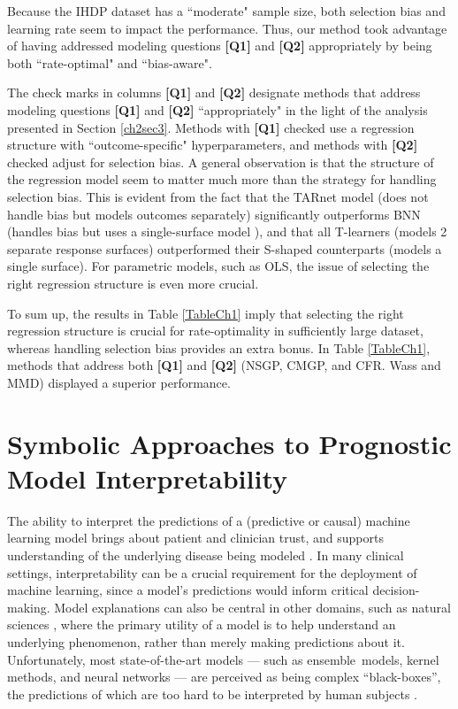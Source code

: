 \documentclass [PhD] {uclathes}
\begin{document}
Because the IHDP dataset has a ``moderate" sample size, both selection bias and learning rate seem to impact the performance. Thus, our method took advantage of having addressed modeling questions \textbf{[Q1]} and \textbf{[Q2]} appropriately by being both ``rate-optimal" and ``bias-aware". 

The check marks in columns \textbf{[Q1]} and \textbf{[Q2]} designate methods that address modeling questions \textbf{[Q1]} and \textbf{[Q2]} ``appropriately" in the light of the analysis presented in Section \ref{ch2sec3}. Methods with \textbf{[Q1]} checked use a regression structure with ``outcome-specific" hyperparameters, and methods with \textbf{[Q2]} checked adjust for selection bias. A general observation is that the structure of the regression model seem to matter much more than the strategy for handling selection bias. This is evident from the fact that the TARnet model (does not handle bias but models outcomes separately) significantly outperforms BNN (handles bias but uses a single-surface model \cite{shalit2016estimating}), and that all T-learners (models 2 separate response surfaces) outperformed their S-shaped counterparts (models a single surface). For parametric models, such as OLS, the issue of selecting the right regression structure is even more crucial. 

To sum up, the results in Table \ref{TableCh1} imply that selecting the right regression structure is crucial for rate-optimality in sufficiently large dataset, whereas handling selection bias provides an extra bonus. In Table \ref{TableCh1}, methods that address both \textbf{[Q1]} and \textbf{[Q2]} (NSGP, CMGP, and CFR. Wass and MMD) displayed a superior performance.

\chapter{Symbolic Approaches to Prognostic Model Interpretability}

The ability to interpret the predictions of a (predictive or causal) machine learning model brings about patient and clinician trust, and supports understanding of the underlying disease being modeled \cite{lundberg2017unified,lipton2016mythos, alaa2019}. In many clinical settings, interpretability can be a crucial requirement for the deployment of machine learning, since a model's predictions would inform critical decision-making. Model explanations can also be central in other domains, such as natural sciences \cite{schmidt2009distilling,wang2019symbolic}, where the primary utility of a model is to help understand an underlying phenomenon, rather than merely making predictions about it. Unfortunately, most state-of-the-art models --- such as ensemble~models, kernel methods, and neural networks --- are perceived as being complex ``black-boxes'', the predictions of which are too hard to be interpreted by human subjects \cite{lundberg2017unified,yoon2018invase,jordon2018knockoffgan,shrikumar2017learning,lou2013accurate,elenberg2017streaming,bouchard2017union,melis2018towards,tsang2018neural,zhang2018interpreting,chen2018learning,ribeiro2016should}. 
\end{document}

